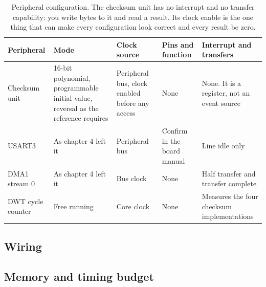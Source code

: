 \begin{table}[H]\centering\small
\begin{tabular}{p{22mm}p{26mm}p{24mm}p{30mm}p{30mm}}
\toprule
Peripheral & Mode & Clock source & Pins and function & Interrupt and transfers \\
\midrule
Checksum unit & 16-bit polynomial, programmable initial value, reversal as the reference requires & Peripheral bus, clock enabled before any access & None & None. It is a register, not an event source \\
USART3 & As chapter 4 left it & Peripheral bus & Confirm in the board manual & Line idle only \\
DMA1 stream 0 & As chapter 4 left it & Bus clock & None & Half transfer and transfer complete \\
DWT cycle counter & Free running & Core clock & None & Measures the four checksum implementations \\
\bottomrule
\end{tabular}
\caption{Peripheral configuration. The checksum unit has no interrupt and no transfer capability: you write bytes to it and read a result. Its clock enable is the one thing that can make every configuration look correct and every result be zero.}
\end{table}

\subsection*{Wiring}


\subsection*{Memory and timing budget}


